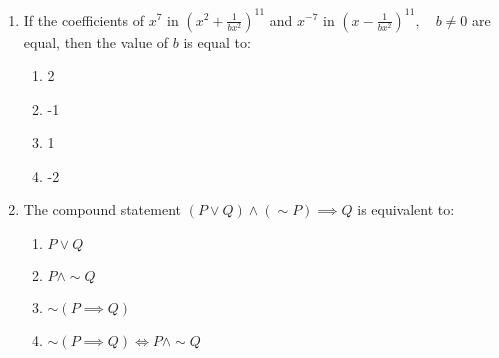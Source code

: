 \documentclass[journal]{IEEEtran}
\numberwithin{equation}{enumi}
\numberwithin{figure}{enumi}
\begin{document}
\begin{enumerate}
\item
If the coefficients of $ x^7 $ in $\left( x^2 + \frac{1}{bx^2} \right)^{11}$ and $ x^{-7} $ in  $\left( x - \frac{1}{bx^2} \right)^{11}, \quad b \neq 0$
are equal, then the value of $ b $ is equal to:
\begin{enumerate}
    \item 2
    \item -1
    \item 1
    \item -2
\end{enumerate}
\item The compound statement $(P\vee Q)\wedge(\sim P)\implies Q$ is equivalent to:
\begin{enumerate}
    \item $P\vee Q$
    \item $P \wedge \sim Q$
    \item $\sim (P \implies Q)$
    \item $\sim (P\implies Q)\Leftrightarrow P \wedge \sim Q$
\end{enumerate}
 

\end{enumerate}
\end{document}
